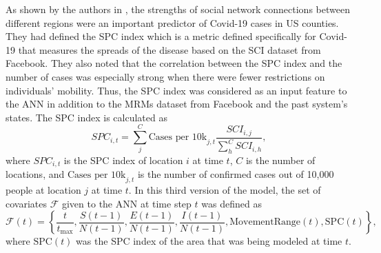 As shown by the authors in \cite{kuchlerGeographicSpreadCOVID192020}, the strengths of social network connections between different regions were an important predictor of Covid-19 cases in US counties.
They had defined the \gls{SPC} index which is a metric defined specifically for Covid-19 that measures the spreads of the disease based on the \gls{SCI} dataset from Facebook.
They also noted that the correlation between the \gls{SPC} index and the number of cases was especially strong when there were fewer restrictions on individuals' mobility.
Thus, the \gls{SPC} index was considered as an input feature to the \gls{ANN} in addition to the \glspl{MRM} dataset from Facebook and the past system's states.
The \gls{SPC} index is calculated as
\begin{equation}
    SPC_{i,t} = \sum_j^C \text{Cases per 10k}_{j,t} \frac{SCI_{i,j}}{\sum_h^C SCI_{i,h}},
\end{equation}
where $SPC_{i,t}$ is the \gls{SPC} index of location $i$ at time $t$, $C$ is the number of locations, and $\text{Cases per 10k}_{j,t}$ is the number of confirmed cases out of 10,000 people at location $j$ at time $t$.
In this third version of the model, the set of covariates $\mathcal{F}$ given to the \gls{ANN} at time step $t$ was defined as
\begin{equation}
    \mathcal{F}(t) = \left\lbrace \frac{t}{t_\text{max}}, \frac{S(t-1)}{N(t-1)}, \frac{E(t-1)}{N(t-1)}, \frac{I(t-1)}{N(t-1)}, \text{MovementRange}(t), \text{SPC}(t) \right\rbrace,
\end{equation}
where $\text{SPC}(t)$ was the \gls{SPC} index of the area that was being modeled at time $t$.